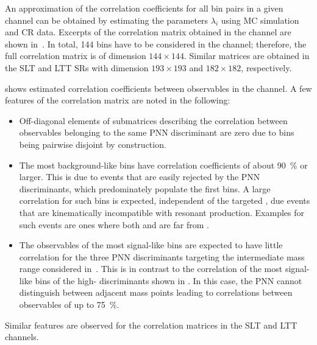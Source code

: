 An approximation of the correlation coefficients for all bin pairs in a given
channel can be obtained by estimating the parameters $\lambda_i$ using MC
simulation and CR data. Excerpts of the correlation matrix obtained in the
\hadhad channel are shown in~. In
total, 144 bins have to be considered in the \hadhad channel; therefore, the
full correlation matrix is of dimension $144 \times 144$. Similar matrices are
obtained in the \lephad SLT and LTT SRs with dimension $193 \times 193$ and
$182 \times 182$, respectively.

 shows estimated correlation
coefficients between observables in the \hadhad channel. A few features of the
correlation matrix are noted in the following:
\begin{itemize}

\item Off-diagonal elements of submatrices describing the correlation between
  observables belonging to the same PNN discriminant are zero due to bins being
  pairwise disjoint by construction.

\item The most background-like bins have correlation coefficients of about
  \SI{90}{\percent} or larger. This is due to events that are easily rejected by
  the PNN discriminants, which predominately populate the first bins. A large
  correlation for such bins is expected, independent of the targeted \mX, due
  events that are kinematically incompatible with resonant \HH
  production. Examples for such events are ones where both \mMMC and \mBB are
  far from \mH.

\item The observables of the most signal-like bins are expected to have little
  correlation for the three PNN discriminants targeting the intermediate mass
  range considered in~.  This is
  in contrast to the correlation of the most signal-like bins of the high-\mX
  discriminants shown in . In this
  case, the PNN cannot distinguish between adjacent mass points leading to
  correlations between observables of up to \SI{75}{\percent}.

\end{itemize}
Similar features are observed for the correlation matrices in the \lephad SLT
and LTT channels.

